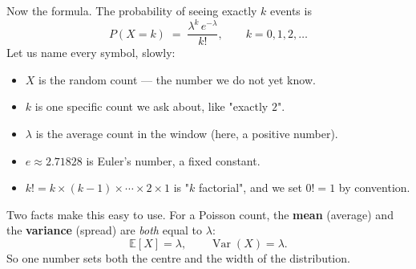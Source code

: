 \documentclass[a4paper,11pt]{article}
\begin{document}
Now the formula. The probability of seeing exactly $k$ events is
%
\begin{equation}
  P(X = k) \;=\; \frac{\lambda^{k}\, e^{-\lambda}}{k!},
  \qquad k = 0, 1, 2, \dots
  \label{eq:poisson}
\end{equation}
%
Let us name every symbol, slowly:
\begin{itemize}
  \item $X$ is the random count — the number we do not yet know.
  \item $k$ is one specific count we ask about, like "exactly $2$".
  \item $\lambda$ is the average count in the window (here, a positive number).
  \item $e \approx 2.71828$ is Euler's number, a fixed constant.
  \item $k! = k \times (k{-}1) \times \cdots \times 2 \times 1$ is "$k$
        factorial", and we set $0! = 1$ by convention.
\end{itemize}

\noindent Two facts make this easy to use. For a Poisson count, the
\textbf{mean} (average) and the \textbf{variance} (spread) are \emph{both} equal
to $\lambda$:
%
\begin{equation}
  \mathbb{E}[X] = \lambda,
  \qquad
  \operatorname{Var}(X) = \lambda .
  \label{eq:meanvar}
\end{equation}
%
So one number sets both the centre and the width of the distribution.
\end{document}
